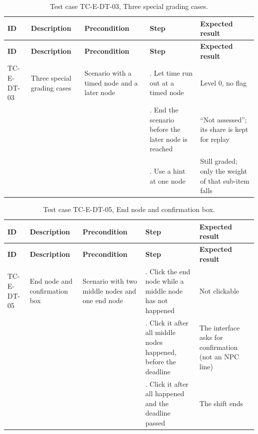 {\small
\begin{longtable}{|>{\raggedright\arraybackslash}p{}|>{\raggedright\arraybackslash}p{}|>{\raggedright\arraybackslash}p{}|>{\raggedright\arraybackslash}p{}|>{\raggedright\arraybackslash}p{}|}
\caption{Test case TC-E-DT-03, Three special grading cases.} \\
\hline
\textbf{ID} & \textbf{Description} & \textbf{Precondition} & \textbf{Step} & \textbf{Expected result} \\ \hline
\endfirsthead
\hline
\textbf{ID} & \textbf{Description} & \textbf{Precondition} & \textbf{Step} & \textbf{Expected result} \\ \hline
\endhead
TC-E-DT-03 & Three special grading cases & Scenario with a timed node and a later node & 1. Let time run out at a timed node & Level 0, no flag \\ \hline
 &  &  & 2. End the scenario before the later node is reached & ``Not assessed''; its share is kept for replay \\ \hline
 &  &  & 3. Use a hint at one node & Still graded; only the weight of that sub-item falls \\ \hline
\end{longtable}
}

{\small
\begin{longtable}{|>{\raggedright\arraybackslash}p{}|>{\raggedright\arraybackslash}p{}|>{\raggedright\arraybackslash}p{}|>{\raggedright\arraybackslash}p{}|>{\raggedright\arraybackslash}p{}|}
\caption{Test case TC-E-DT-05, End node and confirmation box.} \\
\hline
\textbf{ID} & \textbf{Description} & \textbf{Precondition} & \textbf{Step} & \textbf{Expected result} \\ \hline
\endfirsthead
\hline
\textbf{ID} & \textbf{Description} & \textbf{Precondition} & \textbf{Step} & \textbf{Expected result} \\ \hline
\endhead
TC-E-DT-05 & End node and confirmation box & Scenario with two middle nodes and one end node & 1. Click the end node while a middle node has not happened & Not clickable \\ \hline
 &  &  & 2. Click it after all middle nodes happened, before the deadline & The interface asks for confirmation (not an NPC line) \\ \hline
 &  &  & 3. Click it after all happened and the deadline passed & The shift ends \\ \hline
\end{longtable}
}

